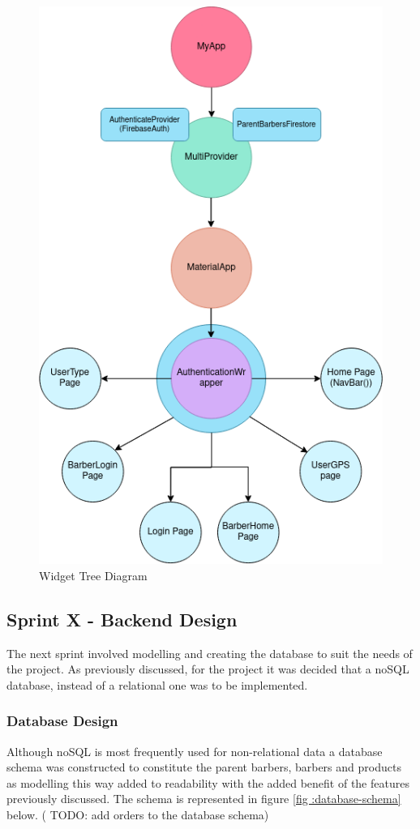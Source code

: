 \documentclass[12pt]{article}
\begin{document}
		
	\begin{figure}[H]
		\centering
		\includegraphics[scale=0.55]{images/widget-tree.png}
		\caption{Widget Tree Diagram}
		\label{fig:widget-tree}
	\end{figure}
	
	


	
	
	\subsection{Sprint X - Backend Design}
	The next sprint involved modelling and creating the database to suit the needs of the project. As previously discussed, for the project it was decided that a noSQL database, instead of a relational one was to be implemented.
	
	\subsubsection{Database Design}
	Although noSQL is most frequently used for non-relational data a database schema was constructed to constitute the parent barbers, barbers and products as modelling this way added to readability with the added benefit of the features previously discussed. The schema is represented in figure \ref{fig :database-schema} below.
	( TODO: add orders to the database schema)
	
\end{document}
